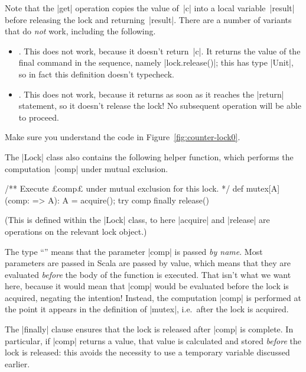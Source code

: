 
Note that the |get| operation copies the value of~|c| into a local
variable~|result| before releasing the lock and returning~|result|.  There are
a number of variants that do \emph{not} work, including the following.
\begin{itemize}
\item {}.  This
  does not work, because it doesn't return~|c|.  It returns the value of the
  final command in the sequence, namely |lock.release()|; this has type
  |Unit|, so in fact this definition doesn't typecheck.

\item {}.
  This does not work, because it returns as soon as it reaches the |return|
  statement, so it doesn't release the lock!  No subsequent operation will be
  able to proceed.
\end{itemize}

\begin{instruction}
Make sure you understand the code in Figure~\ref{fig:counter-lock0}.
\end{instruction}


The |Lock| class also contains the following helper function, which performs
the computation~|comp| under mutual exclusion.
\begin{scala}
  /** Execute £comp£ under mutual exclusion for this lock. */
  def mutex[A](comp: => A): A = {
    acquire(); try{ comp } finally{ release() }
  } 
\end{scala}
%
(This is defined within the |Lock| class, to here |acquire| and |release| are
operations on the relevant lock object.)

The type ``'' means that the parameter |comp| is passed \emph{by
  name}.  Most parameters are passed in Scala are passed by value, which means
that they are evaluated \emph{before} the body of the function is executed.
That isn't what we want here, because it would mean that |comp| would be
evaluated before the lock is acquired, negating the intention!  Instead, the
computation |comp| is performed at the point it appears in the definition of
|mutex|, i.e.~after the lock is acquired.

The |finally| clause ensures that the lock is released after |comp| is
complete.  In particular, if |comp| returns a value, that value is calculated
and stored \emph{before} the lock is released: this avoids the necessity to
use a temporary variable discussed earlier.

